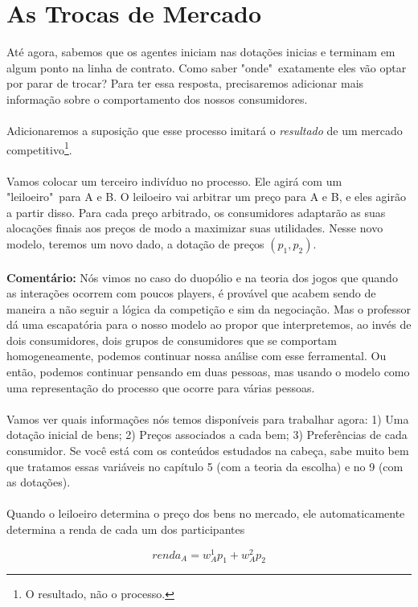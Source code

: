 \documentclass[a4paper,11pt,oneside]{book}
\theoremstyle{definition}
\theoremstyle{break}
\begin{document}
\section{As Trocas de Mercado}

Até agora, sabemos que os agentes iniciam nas dotações inicias e terminam em algum ponto na linha de contrato. Como saber "onde"\ exatamente eles vão optar por parar de trocar? Para ter essa resposta, precisaremos adicionar mais informação sobre o comportamento dos nossos consumidores.
\\
\\
Adicionaremos a suposição que esse processo imitará o \textit{resultado} de um mercado competitivo\footnote{O resultado, não o processo.}.
\\
\\
Vamos colocar um terceiro indivíduo no processo. Ele agirá com um "leiloeiro"\ para A e B. O leiloeiro vai arbitrar um preço para A e B, e eles agirão a partir disso. Para cada preço arbitrado, os consumidores adaptarão as suas alocações finais aos preços de modo a maximizar suas utilidades. Nesse novo modelo, teremos  um novo dado, a dotação de preços $(p_1,p_2)$.
\\
\\
\textbf{Comentário:} Nós vimos no caso do duopólio e na teoria dos jogos que quando as interações ocorrem com poucos players, é provável que acabem sendo de maneira a não seguir a lógica da competição e sim da negociação. Mas o professor dá uma escapatória para o nosso modelo ao propor que interpretemos, ao invés de dois consumidores, dois grupos de consumidores que se comportam homogeneamente, podemos continuar nossa análise com esse ferramental. Ou então, podemos continuar pensando em duas pessoas, mas usando o modelo como uma representação do processo que ocorre para várias pessoas.
\\
\\
Vamos ver quais informações nós temos disponíveis para trabalhar agora: 1) Uma dotação inicial de bens; 2) Preços associados a cada bem; 3) Preferências de cada consumidor. Se você está com os conteúdos estudados na cabeça, sabe muito bem que tratamos essas variáveis no capítulo 5 (com a teoria da escolha) e no 9 (com as dotações).
\\
\\
Quando o leiloeiro determina o preço dos bens no mercado, ele automaticamente determina a renda de cada um dos participantes

$$renda_A = w_A^1 p_1 + w_A^2 p_2$$
\end{document}
